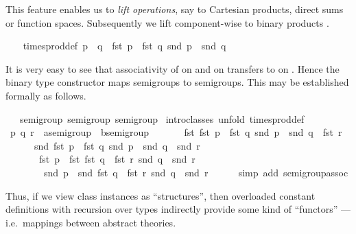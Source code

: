 \begin{isabellebody}
\begin{isamarkuptext}
 This feature enables us to \emph{lift operations}, say to Cartesian
 products, direct sums or function spaces.  Subsequently we lift
 \isa{{\isasymodot}} component-wise to binary products .%
\end{isamarkuptext}%
\isamarkuptrue%
\ {\isacharparenleft}\isanewline
\ \ times{\isacharunderscore}prod{\isacharunderscore}def{\isacharcolon}\ {\isachardoublequote}p\ {\isasymodot}\ q\ {\isasymequiv}\ {\isacharparenleft}fst\ p\ {\isasymodot}\ fst\ q{\isacharcomma}\ snd\ p\ {\isasymodot}\ snd\ q{\isacharparenright}{\isachardoublequote}\isamarkupfalse%
%
\begin{isamarkuptext}%
It is very easy to see that associativity of \isa{{\isasymodot}} on 
 and \isa{{\isasymodot}} on  transfers to \isa{{\isasymodot}} on .  Hence the binary type constructor \isa{{\isasymodot}} maps semigroups to
 semigroups.  This may be established formally as follows.%
\end{isamarkuptext}%
\isamarkuptrue%
\ {\isacharasterisk}\ {\isacharcolon}{\isacharcolon}\ {\isacharparenleft}semigroup{\isacharcomma}\ semigroup{\isacharparenright}\ semigroup\isanewline
\isamarkupfalse%
\ {\isacharparenleft}intro{\isacharunderscore}classes{\isacharcomma}\ unfold\ times{\isacharunderscore}prod{\isacharunderscore}def{\isacharparenright}\isanewline
\ \ \isamarkupfalse%
\ p\ q\ r\ {\isacharcolon}{\isacharcolon}\ {\isachardoublequote}{\isacharprime}a{\isasymColon}semigroup\ {\isasymtimes}\ {\isacharprime}b{\isasymColon}semigroup{\isachardoublequote}\isanewline
\ \ \isamarkupfalse%
\isanewline
\ \ \ \ {\isachardoublequote}{\isacharparenleft}fst\ {\isacharparenleft}fst\ p\ {\isasymodot}\ fst\ q{\isacharcomma}\ snd\ p\ {\isasymodot}\ snd\ q{\isacharparenright}\ {\isasymodot}\ fst\ r{\isacharcomma}\isanewline
\ \ \ \ \ \ snd\ {\isacharparenleft}fst\ p\ {\isasymodot}\ fst\ q{\isacharcomma}\ snd\ p\ {\isasymodot}\ snd\ q{\isacharparenright}\ {\isasymodot}\ snd\ r{\isacharparenright}\ {\isacharequal}\isanewline
\ \ \ \ \ \ \ {\isacharparenleft}fst\ p\ {\isasymodot}\ fst\ {\isacharparenleft}fst\ q\ {\isasymodot}\ fst\ r{\isacharcomma}\ snd\ q\ {\isasymodot}\ snd\ r{\isacharparenright}{\isacharcomma}\isanewline
\ \ \ \ \ \ \ \ snd\ p\ {\isasymodot}\ snd\ {\isacharparenleft}fst\ q\ {\isasymodot}\ fst\ r{\isacharcomma}\ snd\ q\ {\isasymodot}\ snd\ r{\isacharparenright}{\isacharparenright}{\isachardoublequote}\isanewline
\ \ \ \ \isamarkupfalse%
\ {\isacharparenleft}simp\ add{\isacharcolon}\ semigroup{\isachardot}assoc{\isacharparenright}\isanewline
\isamarkupfalse%
\isamarkupfalse%
%
\begin{isamarkuptext}%
Thus, if we view class instances as ``structures'', then overloaded
 constant definitions with recursion over types indirectly provide
 some kind of ``functors'' --- i.e.\ mappings between abstract
 theories.%
\end{isamarkuptext}%
\isamarkuptrue%
\isamarkupfalse%
\end{isabellebody}%
